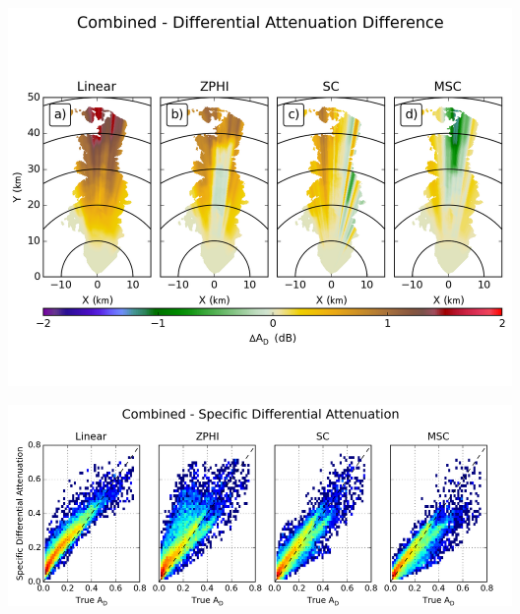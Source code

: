 \documentclass[red]{beamer}
\begin{document}
\begin{frame}
	\begin{center}
		\includegraphics[scale=0.45]{figures/C_Combined_Differential_Attenuation_Difference.png}
	\end{center}
\end{frame}

\begin{frame}
	\begin{center}
		\includegraphics[scale=0.45]{figures/C_Combined_Specific_Differential_Attenuation_scatter.png}
	\end{center}
\end{frame}
\end{document}

